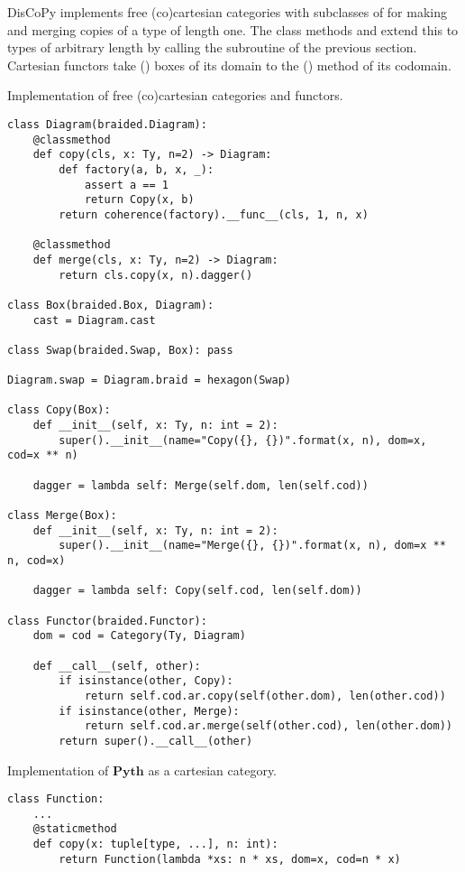 DisCoPy implements free (co)cartesian categories with subclasses of  for making and merging  copies of a type  of length one.
The class methods  and  extend this to types of arbitrary length by calling the  subroutine of the previous section.
Cartesian functors take  () boxes of its domain to the  () method of its codomain.

\begin{python}
{\normalfont Implementation of free (co)cartesian categories and functors.}

\begin{verbatim}
class Diagram(braided.Diagram):
    @classmethod
    def copy(cls, x: Ty, n=2) -> Diagram:
        def factory(a, b, x, _):
            assert a == 1
            return Copy(x, b)
        return coherence(factory).__func__(cls, 1, n, x)

    @classmethod
    def merge(cls, x: Ty, n=2) -> Diagram:
        return cls.copy(x, n).dagger()

class Box(braided.Box, Diagram):
    cast = Diagram.cast

class Swap(braided.Swap, Box): pass

Diagram.swap = Diagram.braid = hexagon(Swap)

class Copy(Box):
    def __init__(self, x: Ty, n: int = 2):
        super().__init__(name="Copy({}, {})".format(x, n), dom=x, cod=x ** n)

    dagger = lambda self: Merge(self.dom, len(self.cod))

class Merge(Box):
    def __init__(self, x: Ty, n: int = 2):
        super().__init__(name="Merge({}, {})".format(x, n), dom=x ** n, cod=x)

    dagger = lambda self: Copy(self.cod, len(self.dom))

class Functor(braided.Functor):
    dom = cod = Category(Ty, Diagram)

    def __call__(self, other):
        if isinstance(other, Copy):
            return self.cod.ar.copy(self(other.dom), len(other.cod))
        if isinstance(other, Merge):
            return self.cod.ar.merge(self(other.cod), len(other.dom))
        return super().__call__(other)
\end{verbatim}
\end{python}

\begin{python}\label{listing:python-co-cartesian}
{\normalfont Implementation of $\mathbf{Pyth}$ as a cartesian category.}

\begin{verbatim}
class Function:
    ...
    @staticmethod
    def copy(x: tuple[type, ...], n: int):
        return Function(lambda *xs: n * xs, dom=x, cod=n * x)
\end{verbatim}
\end{python}

